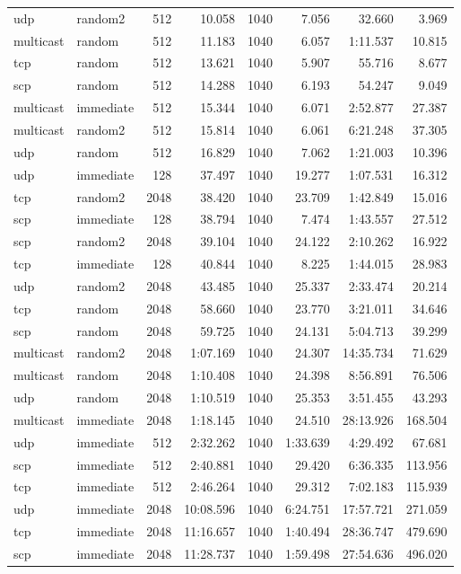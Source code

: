 \begin{tabular}{|llrrrrrr|}
udp & random2 & 512 &  10.058 & 1040 & 7.056 & 32.660 & 3.969\\
multicast & random & 512 &  11.183 & 1040 & 6.057 & 1:11.537 & 10.815\\
tcp & random & 512 &  13.621 & 1040 & 5.907 & 55.716 & 8.677\\
scp & random & 512 &  14.288 & 1040 & 6.193 & 54.247 & 9.049\\
multicast & immediate & 512 &  15.344 & 1040 & 6.071 & 2:52.877 & 27.387\\
multicast & random2 & 512 &  15.814 & 1040 & 6.061 & 6:21.248 & 37.305\\
udp & random & 512 &  16.829 & 1040 & 7.062 & 1:21.003 & 10.396\\
udp & immediate & 128 &  37.497 & 1040 & 19.277 & 1:07.531 & 16.312\\
tcp & random2 & 2048 &  38.420 & 1040 & 23.709 & 1:42.849 & 15.016\\
scp & immediate & 128 &  38.794 & 1040 & 7.474 & 1:43.557 & 27.512\\
scp & random2 & 2048 &  39.104 & 1040 & 24.122 & 2:10.262 & 16.922\\
tcp & immediate & 128 &  40.844 & 1040 & 8.225 & 1:44.015 & 28.983\\
udp & random2 & 2048 &  43.485 & 1040 & 25.337 & 2:33.474 & 20.214\\
tcp & random & 2048 &  58.660 & 1040 & 23.770 & 3:21.011 & 34.646\\
scp & random & 2048 &  59.725 & 1040 & 24.131 & 5:04.713 & 39.299\\
multicast & random2 & 2048 &  1:07.169 & 1040 & 24.307 & 14:35.734 & 71.629\\
multicast & random & 2048 &  1:10.408 & 1040 & 24.398 & 8:56.891 & 76.506\\
udp & random & 2048 &  1:10.519 & 1040 & 25.353 & 3:51.455 & 43.293\\
multicast & immediate & 2048 &  1:18.145 & 1040 & 24.510 & 28:13.926 & 168.504\\
udp & immediate & 512 &  2:32.262 & 1040 & 1:33.639 & 4:29.492 & 67.681\\
scp & immediate & 512 &  2:40.881 & 1040 & 29.420 & 6:36.335 & 113.956\\
tcp & immediate & 512 &  2:46.264 & 1040 & 29.312 & 7:02.183 & 115.939\\
udp & immediate & 2048 &  10:08.596 & 1040 & 6:24.751 & 17:57.721 & 271.059\\
tcp & immediate & 2048 &  11:16.657 & 1040 & 1:40.494 & 28:36.747 & 479.690\\
scp & immediate & 2048 &  11:28.737 & 1040 & 1:59.498 & 27:54.636 & 496.020\\
\hline
\end{tabular}
